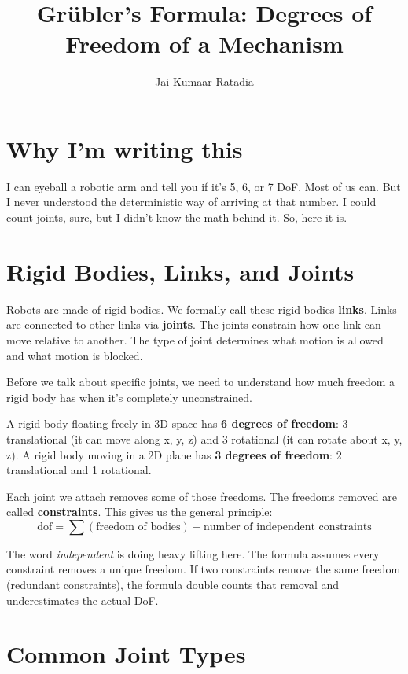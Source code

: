 \documentclass{article}
\title{\textbf{Gr\"{u}bler's Formula: Degrees of Freedom of a Mechanism}}
\author{Jai Kumaar Ratadia}
\date{}
\begin{document}
\maketitle
\setlength{\parskip}{1em}

\section{Why I'm writing this}

I can eyeball a robotic arm and tell you if it's 5, 6, or 7 DoF. Most of us can. But I never understood the deterministic way of arriving at that number. I could count joints, sure, but I didn't know the math behind it. So, here it is.

\section{Rigid Bodies, Links, and Joints}

Robots are made of rigid bodies. We formally call these rigid bodies \textbf{links}. Links are connected to other links via \textbf{joints}. The joints constrain how one link can move relative to another. The type of joint determines what motion is allowed and what motion is blocked.

Before we talk about specific joints, we need to understand how much freedom a rigid body has when it's completely unconstrained.

A rigid body floating freely in 3D space has \textbf{6 degrees of freedom}: 3 translational (it can move along x, y, z) and 3 rotational (it can rotate about x, y, z). A rigid body moving in a 2D plane has \textbf{3 degrees of freedom}: 2 translational and 1 rotational.

Each joint we attach removes some of those freedoms. The freedoms removed are called \textbf{constraints}. This gives us the general principle:
\[
    \text{dof} = \sum(\text{freedom of bodies}) - \text{number of independent constraints}
\]

The word \textit{independent} is doing heavy lifting here. The formula assumes every constraint removes a unique freedom. If two constraints remove the same freedom (redundant constraints), the formula double counts that removal and underestimates the actual DoF.

\section{Common Joint Types}
\end{document}
